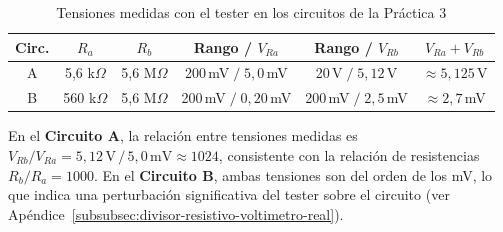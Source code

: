\begin{table}[H]
    \centering
    \caption{Tensiones medidas con el tester en los circuitos de la Práctica 3}
    \label{tab:resultados-p3}
    \begin{tabular}{|c|c|c|c|c|c|}
        \hline
        \textbf{Circ.} & $R_a$ & $R_b$ & \textbf{Rango / $V_{Ra}$} & \textbf{Rango / $V_{Rb}$} & $V_{Ra} + V_{Rb}$ \\ \hline
        A & 5{,}6 k$\Omega$ & 5{,}6 M$\Omega$
          & 200\,mV$\;/\;5{,}0$\,mV
          & 20\,V$\;/\;5{,}12$\,V
          & $\approx 5{,}125$\,V \\ \hline
        B & 560 k$\Omega$ & 5{,}6 M$\Omega$
          & 200\,mV$\;/\;0{,}20$\,mV
          & 200\,mV$\;/\;2{,}5$\,mV
          & $\approx 2{,}7$\,mV \\ \hline
    \end{tabular}
\end{table}
 
En el \textbf{Circuito A}, la relación entre tensiones medidas es
$V_{Rb}/V_{Ra} = 5{,}12\,\text{V}\,/\,5{,}0\,\text{mV} \approx 1024$,
consistente con la relación de resistencias $R_b/R_a = 1000$.
En el \textbf{Circuito B}, ambas tensiones son del orden de los mV, lo que indica
una perturbación significativa del tester sobre el circuito
(ver Apéndice~\ref{subsubsec:divisor-resistivo-voltimetro-real}).